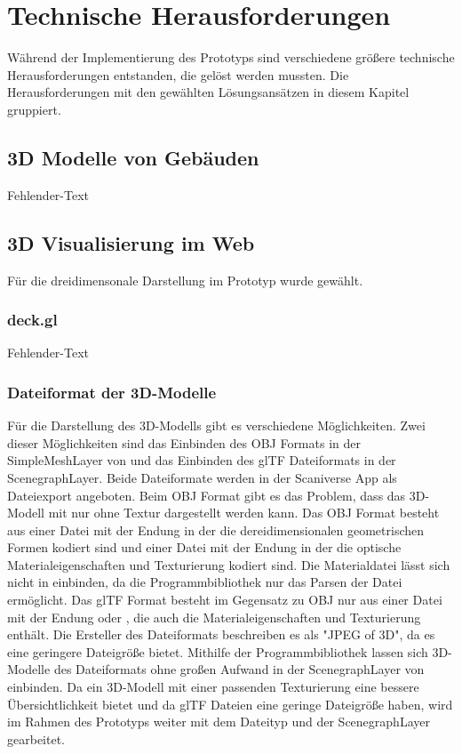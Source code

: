 \newpage
\section{Technische Herausforderungen}
Während der Implementierung des Prototyps sind verschiedene größere technische Herausforderungen entstanden, die gelöst werden mussten. Die Herausforderungen mit den gewählten Lösungsansätzen in diesem Kapitel gruppiert. 

\subsection{3D Modelle von Gebäuden}
Fehlender-Text

\subsection{3D Visualisierung im Web}
Für die dreidimensonale Darstellung im Prototyp wurde \deckgl{} gewählt.

\subsubsection{deck.gl}
Fehlender-Text

\subsubsection{Dateiformat der 3D-Modelle}

Für die Darstellung des 3D-Modells gibt es verschiedene Möglichkeiten. Zwei dieser Möglichkeiten sind das Einbinden des \ac{OBJ} Formats in der SimpleMeshLayer von \deckgl{} und das Einbinden des \ac{glTF} Dateiformats in der ScenegraphLayer. Beide Dateiformate werden in der Scaniverse App als Dateiexport angeboten. Beim \ac{OBJ} Format gibt es das Problem, dass das 3D-Modell mit \deckgl{} nur ohne Textur dargestellt werden kann. Das \ac{OBJ} Format besteht aus einer Datei mit der Endung \obj{} in der die dereidimensionalen geometrischen Formen kodiert sind und einer Datei mit der Endung \mtl{} in der die optische Materialeigenschaften und Texturierung kodiert sind. Die Materialdatei lässt sich nicht in \deckgl{} einbinden, da die \loadersgl{} Programmbibliothek nur das Parsen der \obj{} Datei ermöglicht. Das \ac{glTF} Format besteht im Gegensatz zu \ac{OBJ} nur aus einer Datei mit der Endung \gltf{} oder \glb{}, die auch die Materialeigenschaften und Texturierung enthält. Die Ersteller des Dateiformats beschreiben es als "JPEG of 3D", da es eine geringere Dateigröße bietet. Mithilfe der \loadersgl{} Programmbibliothek lassen sich 3D-Modelle des Dateiformats ohne großen Aufwand in der ScenegraphLayer von \deckgl{} einbinden. Da ein 3D-Modell mit einer passenden Texturierung eine bessere Übersichtlichkeit bietet und da \ac{glTF} Dateien eine geringe Dateigröße haben, wird im Rahmen des Prototyps weiter mit dem Dateityp und der ScenegraphLayer gearbeitet.

